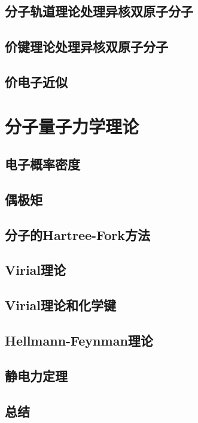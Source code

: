 \documentclass{book}
\begin{document}
	\section{分子轨道理论处理异核双原子分子}
	
	\section{价键理论处理异核双原子分子}
	
	\section{价电子近似}
	
	\chapter{分子量子力学理论}
	\section{电子概率密度}
	
	\section{偶极矩}
	
	\section{分子的Hartree-Fork方法}
	
	\section{Virial理论}
	
	\section{Virial理论和化学键}
	
	\section{Hellmann-Feynman理论}
	
	\section{静电力定理}
	
	\section*{总结}
	
\end{document}

